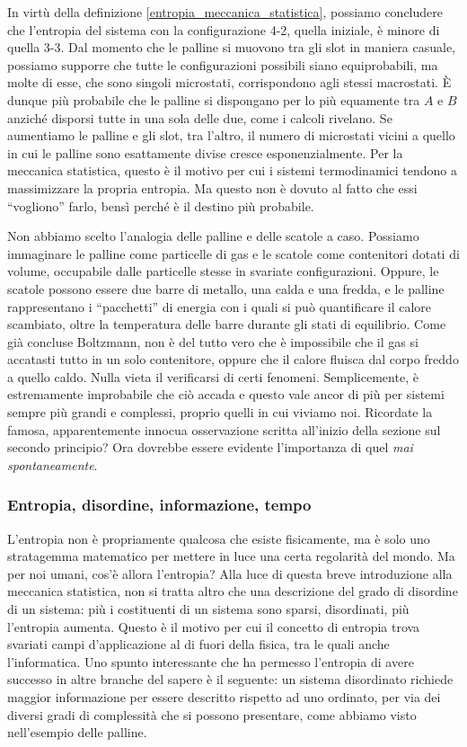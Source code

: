 In virtù della definizione \ref{entropia_meccanica_statistica}, possiamo concludere che
l'entropia del sistema con la configurazione 4-2, quella iniziale,
è minore di quella 3-3.
Dal momento che le palline si muovono tra gli slot in maniera
casuale, possiamo supporre che tutte le configurazioni possibili
siano equiprobabili, ma molte di esse, che sono singoli microstati,
corrispondono agli stessi macrostati. È dunque più probabile che
le palline si dispongano per lo più equamente tra $A$ e $B$
anziché disporsi tutte in una sola delle due, come i calcoli
rivelano. Se aumentiamo
le palline e gli slot, tra l'altro, il numero di microstati
vicini a quello in cui le palline sono esattamente divise
cresce esponenzialmente. Per la meccanica statistica, questo
è il motivo per cui i sistemi termodinamici tendono a massimizzare
la propria entropia. Ma questo non è dovuto al fatto che essi
``vogliono'' farlo, bensì perché è il destino più probabile.

Non abbiamo scelto l'analogia delle palline e delle scatole a caso.
Possiamo immaginare le palline come particelle di gas e le scatole
come contenitori dotati di volume, occupabile dalle particelle stesse
in svariate configurazioni. Oppure, le scatole possono essere
due barre di metallo, una calda e una fredda, e le palline
rappresentano i ``pacchetti'' di energia con i quali si può
quantificare il calore scambiato, oltre la temperatura delle barre durante
gli stati di equilibrio. Come già concluse Boltzmann, non è
del tutto vero che è impossibile che il gas si accatasti
tutto in un solo contenitore, oppure che il calore fluisca
dal corpo freddo a quello caldo. Nulla vieta il verificarsi di
certi fenomeni. Semplicemente, è estremamente
improbabile che ciò accada e questo vale ancor di più per sistemi
sempre più grandi e complessi, proprio quelli in cui viviamo noi.
Ricordate la famosa, apparentemente innocua osservazione scritta
all'inizio della sezione sul secondo principio? Ora dovrebbe essere
evidente l'importanza di quel \emph{mai spontaneamente}.

\subsubsection*{Entropia, disordine, informazione, tempo}
L'entropia non è propriamente qualcosa che esiste fisicamente,
ma è solo uno stratagemma matematico per mettere in luce una
certa regolarità del mondo.
Ma per noi umani, cos'è allora l'entropia? Alla luce di questa breve introduzione
alla meccanica statistica, non si tratta altro che una descrizione
del grado di disordine di un sistema: più i costituenti di un
sistema sono sparsi, disordinati, più l'entropia aumenta. Questo
è il motivo per cui il concetto di entropia trova svariati campi
d'applicazione al di fuori della fisica, tra le quali anche
l'informatica. Uno spunto interessante che ha permesso l'entropia
di avere successo in altre branche del sapere è il seguente: un
sistema disordinato richiede maggior informazione per essere
descritto rispetto ad uno ordinato, per via dei diversi gradi
di complessità che si possono presentare, come abbiamo visto
nell'esempio delle palline.

